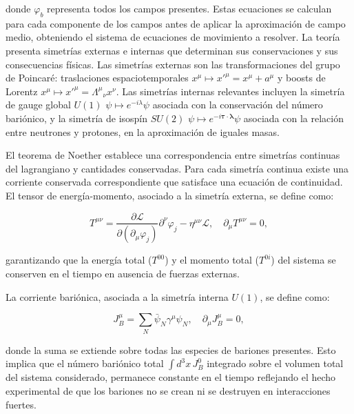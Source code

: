 donde $\varphi_b$ representa todos los campos presentes. Estas ecuaciones se calculan para cada componente de los campos antes de aplicar la aproximación de campo medio, obteniendo el sistema de ecuaciones de movimiento a resolver. La teoría presenta simetrías externas e internas que determinan sus conservaciones y sus consecuencias físicas. Las simetrías externas son las transformaciones del grupo de Poincaré: traslaciones espaciotemporales $x^\mu \mapsto x'^\mu = x^\mu + a^\mu$ y boosts de Lorentz $x^\mu \mapsto x'^\mu = \Lambda^\mu{}_\nu x^\nu$. Las simetrías internas relevantes incluyen la simetría de gauge global $U(1)$ $\psi \mapsto e^{-i\lambda}\psi$ asociada con la conservación del número bariónico, y la simetría de isospín $SU(2)$ $\psi \mapsto e^{-i\boldsymbol{\tau}\cdot\boldsymbol{\lambda}}\psi$ asociada con la relación entre neutrones y protones, en la aproximación de iguales masas.

El teorema de Noether establece una correspondencia entre simetrías continuas del lagrangiano y cantidades conservadas. Para cada simetría continua existe una corriente conservada correspondiente que satisface una ecuación de continuidad. El tensor de energía-momento, asociado a la simetría externa, se define como:

\begin{equation}
	T^{\mu\nu} = \frac{\partial \mathcal{L}}{\partial (\partial_\mu \varphi_j)} \partial^\nu \varphi_j - \eta^{\mu\nu} \mathcal{L}, \quad \partial_\mu T^{\mu\nu} = 0,
	\label{eq:tensor_energia_momento}
\end{equation}

garantizando que la energía total ($T^{00}$) y el momento total ($T^{0i}$) del sistema se conserven en el tiempo en ausencia de fuerzas externas.

La corriente bariónica, asociada a la simetría interna $U(1)$, se define como:

\begin{equation}
	J_B^\mu = \sum_N \bar{\psi}_N \gamma^\mu \psi_N, \quad \partial_\mu J_B^\mu = 0,
	\label{eq:corriente_barionica}
\end{equation}

donde la suma se extiende sobre todas las especies de bariones presentes. Esto implica que el número bariónico total $\int d^3x \, J_B^0$ integrado sobre el volumen total del sistema considerado, permanece constante en el tiempo reflejando el hecho experimental de que los bariones no se crean ni se destruyen en interacciones fuertes.

